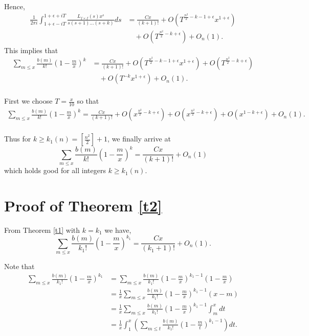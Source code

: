 \documentclass[sn-mathphys,Numbered]{sn-jnl}
\theoremstyle{thmstyleone}%
\theoremstyle{thmstyletwo}%
\theoremstyle{thmstylethree}%
\begin{document}
\noindent
Hence,
\begin{align*}
\frac{1}{2 \pi i} \int_{1+\epsilon-iT}^{1+\epsilon+iT} \frac{L_{f \times f}(s)x^s}{s(s+1)\dots(s+k)} ds &= \frac{Cx}{(k+1)!} + O(T^{\frac{n^2}{2}-k-1+\epsilon}x^{1+\epsilon}) \\
&\quad + O (T^{\frac{n^2}{2}-k+\epsilon}) +O_n(1). 
\end{align*}
This implies that
\begin{align*}
\sum_{m \leq x} \frac{b(m)}{k!} \left( 1- \frac{m}{x} \right)^k &= \frac{Cx}{(k+1)!} + O(T^{\frac{n^2}{2}-k-1+\epsilon}x^{1+\epsilon}) + O (T^{\frac{n^2}{2}-k+\epsilon}) \\
&\quad + O ( T^{-k} x^{1+\epsilon} ) +O_n(1). \\
\end{align*}

\noindent
First we choose $T=\frac{x}{10}$ so that
\begin{align*}
\sum_{m \leq x} \frac{b(m)}{k!} \left( 1-\frac{m}{x} \right)^k = \frac{Cx}{(k+1)!} + O(x^{\frac{n^2}{2}-k+\epsilon})  + O(x^{\frac{n^2}{2}-k+\epsilon}) +O(x^{1-k+\epsilon}) + O_n(1) .\\
\end{align*}

\noindent
Thus for $k \geq k_1(n) = \left[ \frac{n^2}{2} \right]+1$, we finally arrive at
$$ \sum_{m \leq x} \frac{b(m)}{k!} \left( 1-\frac{m}{x} \right)^k = \frac{Cx}{(k+1)!} + O_{n} (1) $$
which holds good for all integers $k \geq k_1(n)$. \\






\section{Proof of Theorem \ref{t2}}

From Theorem \ref{t1} with $k=k_1$ we have,
$$ \sum_{m \leq x} \frac{b(m)}{k_1!} \left( 1-\frac{m}{x} \right)^{k_1} = \frac{Cx}{(k_1+1)!} + O_{n} (1) . $$

Note that
\begin{align*}
\sum_{m \leq x} \frac{b(m)}{k_1!} \left( 1-\frac{m}{x} \right)^{k_1} &= \sum_{m \leq x} \frac{b(m)}{k_1!} \left( 1-\frac{m}{x} \right)^{k_1-1} \left( 1-\frac{m}{x} \right) \\
&= \frac{1}{x} \sum_{m \leq x} \frac{b(m)}{k_1!} \left( 1-\frac{m}{x} \right)^{k_1-1} (x-m) \\
&= \frac{1}{x} \sum_{m \leq x} \frac{b(m)}{k_1!} \left( 1-\frac{m}{x} \right)^{k_1-1} \int_m^x dt \\
&= \frac{1}{x} \int_1^x \left( \sum_{m \leq t} \frac{b(m)}{k_1!} \left( 1-\frac{m}{t} \right)^{k_1-1} \right) dt. \\
\end{align*}
\end{document}
